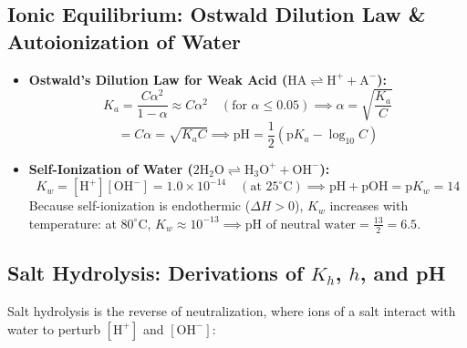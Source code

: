 \documentclass[10pt,twoside,openright]{book}
\begin{document}
\subsection{Ionic Equilibrium: Ostwald Dilution Law \& Autoionization of Water}
\begin{itemize}
  \item \textbf{Ostwald's Dilution Law for Weak Acid ($\mathrm{HA \rightleftharpoons H^+ + A^-}$):}
  \begin{equation}
    K_a = \frac{C\alpha^2}{1 - \alpha} \approx C\alpha^2 \quad (\text{for } \alpha \le 0.05) \implies \alpha = \sqrt{\frac{K_a}{C}}
  \end{equation}
  \begin{equation}
    [\mathrm{H}^+] = C\alpha = \sqrt{K_a C} \implies \text{pH} = \frac{1}{2}\left(\text{p}K_a - \log_{10} C\right)
  \end{equation}
  \item \textbf{Self-Ionization of Water ($\mathrm{2H_2O \rightleftharpoons H_3O^+ + OH^-}$):}
  \begin{equation}
    K_w = [\mathrm{H}^+][\mathrm{OH}^-] = 1.0 \times 10^{-14} \quad (\text{at } 25^\circ\text{C}) \implies \text{pH} + \text{pOH} = \text{p}K_w = 14
  \end{equation}
  Because self-ionization is endothermic ($\Delta H > 0$), $K_w$ increases with temperature: at $80^\circ\text{C}$, $K_w \approx 10^{-13} \implies \text{pH of neutral water} = \frac{13}{2} = 6.5$.
\end{itemize}

\subsection{Salt Hydrolysis: Derivations of $K_h$, $h$, and pH}
Salt hydrolysis is the reverse of neutralization, where ions of a salt interact with water to perturb $[\mathrm{H}^+]$ and $[\mathrm{OH}^-]$:
\end{document}

